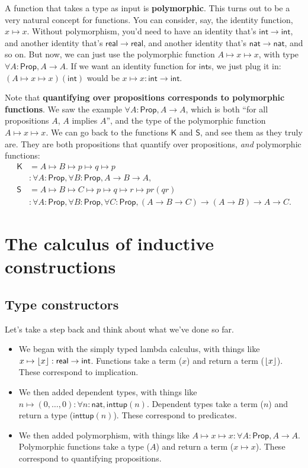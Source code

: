 \documentclass[11pt,paper=letter]{scrartcl}
\newcommand{\sf}{\mathsf}
\newcommand{\prop}{\mathsf{Prop}}
\begin{document}
A function that takes a type as input is \textbf{polymorphic}. This turns out to be a very natural concept for functions. You can consider, say, the identity function, $x \mapsto x$. Without polymorphism, you'd need to have an identity that's $\sf{int} \to \sf{int}$, and another identity that's $\sf{real} \to \sf{real}$, and another identity that's $\sf{nat} \to \sf{nat}$, and so on. But now, we can just use the polymorphic function $A \mapsto x \mapsto x$, with type $\forall A: \prop, A \to A$. If we want an identity function for $\sf{int}$s, we just plug it in: $(A \mapsto x \mapsto x)(\sf{int})$ would be $x \mapsto x : \sf{int} \to \sf{int}$.

Note that \textbf{quantifying over propositions corresponds to polymorphic functions}. We saw the example $\forall A: \prop, A \to A$, which is both ``for all propositions $A$, $A$ implies $A$'', and the type of the polymorphic function $A \mapsto x \mapsto x$. We can go back to the functions $\sf{K}$ and $\sf{S}$, and see them as they truly are. They are both propositions that quantify over propositions, \emph{and} polymorphic functions:
\begin{align*}
\sf{K} &= A \mapsto B \mapsto p \mapsto q \mapsto p \\
&: \forall A: \prop, \forall B: \prop, A \to B \to A, \\
\sf{S} &= A \mapsto B \mapsto C \mapsto p \mapsto q \mapsto r \mapsto pr(qr) \\
&: \forall A: \prop, \forall B: \prop, \forall C: \prop,
(A \to B \to C) \to (A \to B) \to A \to C.
\end{align*}

\clearpage
\section{The calculus of inductive constructions}

\subsection{Type constructors}

Let's take a step back and think about what we've done so far.

\begin{itemize}
\item We began with the simply typed lambda calculus, with things like $x \mapsto \floor{x} : \sf{real} \to \sf{int}$. Functions take a term ($x$) and return a term ($\left\lfloor x \right\rfloor$). These correspond to implication.

\item We then added dependent types, with things like $n \mapsto (0, \ldots, 0) : \forall n: \sf{nat}, \sf{inttup}(n)$. Dependent types take a term ($n$) and return a type ($\sf{inttup}(n)$). These correspond to predicates.

\item We then added polymorphism, with things like $A \mapsto x \mapsto x : \forall A: \sf{Prop}, A \to A$. Polymorphic functions take a type ($A$) and return a term ($x \mapsto x$). These correspond to quantifying propositions.
\end{itemize}
\end{document}
